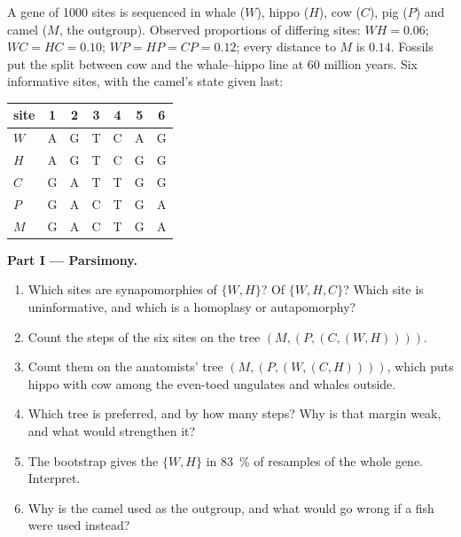 \begin{problem}
\label{pb:b2:phylogenetic-trees:1}
A gene of \num{1000} sites is sequenced in whale ($W$), hippo
($H$), cow ($C$), pig ($P$) and camel ($M$, the outgroup). Observed
proportions of differing sites: $WH = 0.06$; $WC = HC = 0.10$; $WP =
HP = CP = 0.12$; every distance to $M$ is $0.14$. Fossils put the
split between cow and the whale--hippo line at 60 million years.
Six informative sites, with the camel's state given last:
\begin{center}
\begin{tabular}{l@{\quad}cccccc}
site & 1 & 2 & 3 & 4 & 5 & 6 \\ \hline
$W$ & A & G & T & C & A & G \\
$H$ & A & G & T & C & G & G \\
$C$ & G & A & T & T & G & G \\
$P$ & G & A & C & T & G & A \\
$M$ & G & A & C & T & G & A \\
\end{tabular}
\end{center}

\medskip
\noindent\textbf{Part I --- Parsimony.}
\begin{enumerate}
  \item Which sites are synapomorphies of $\{W, H\}$? Of $\{W, H,
        C\}$? Which site is uninformative, and which is a homoplasy
        or autapomorphy?
  \item Count the steps of the six sites on the tree
        $(M,(P,(C,(W,H))))$.
  \item Count them on the anatomists' tree $(M,(P,(W,(C,H))))$,
        which puts hippo with cow among the even-toed ungulates and
        whales outside.
  \item Which tree is preferred, and by how many steps? Why is that
        margin weak, and what would strengthen it?
  \item The bootstrap gives the $\{W, H\}$  in \qty{83}{\%} of
        resamples of the whole gene. Interpret.
  \item Why is the camel used as the outgroup, and what would go
        wrong if a fish were used instead?
\end{enumerate}


\end{problem}
